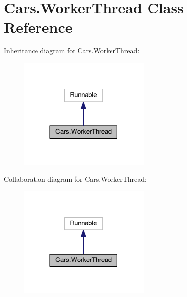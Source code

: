 \hypertarget{classCars_1_1WorkerThread}{}\section{Cars.\+Worker\+Thread Class Reference}
\label{classCars_1_1WorkerThread}


Inheritance diagram for Cars.\+Worker\+Thread\+:\nopagebreak
\begin{figure}[H]
\begin{center}
\leavevmode
\includegraphics[width=182pt]{classCars_1_1WorkerThread__inherit__graph}
\end{center}
\end{figure}


Collaboration diagram for Cars.\+Worker\+Thread\+:\nopagebreak
\begin{figure}[H]
\begin{center}
\leavevmode
\includegraphics[width=182pt]{classCars_1_1WorkerThread__coll__graph}
\end{center}
\end{figure}
